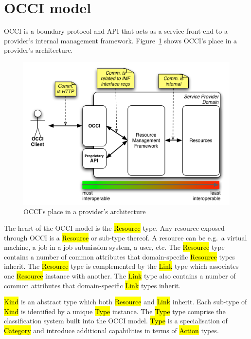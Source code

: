 \documentclass[10pt,a4paper,british]{article}
\begin{document}
\section{OCCI model}
OCCI is a boundary protocol and API
that acts as a service front-end to a provider's internal management
framework. Figure~\ref{fig:placement} shows OCCI's place in a
provider's architecture.

\begin{figure}[!hp]
	\centering
	\includegraphics[scale=0.5]{figs/occi-intro.png}
	\caption{OCCI's place in a provider's architecture}
	\label{fig:placement}
\end{figure}

The heart of the OCCI model is the \hl{Resource} type. Any resource exposed
through OCCI is a \hl{Resource} or sub-type thereof.
A resource can be e.g.~a virtual machine, a job in a job submission system, a
user, etc.
%
The \hl{Resource} type contains a number of common attributes that
domain-specific \hl{Resource} types inherit. The \hl{Resource} type is
complemented by the \hl{Link} type which associates one \hl{Resource} instance
with another.
%
The \hl{Link} type also contains a number of common attributes that
domain-specific \hl{Link} types inherit.

\hl{Kind} is an abstract type which both \hl{Resource} and \hl{Link} inherit.
Each sub-type of \hl{Kind} is identified by a unique \hl{Type} instance.
%
The \hl{Type} type comprise the classification system built into the OCCI
model. \hl{Type} is a specialisation of \hl{Category} and introduce additional
capabilities in terms of \hl{Action} types.
\end{document}
